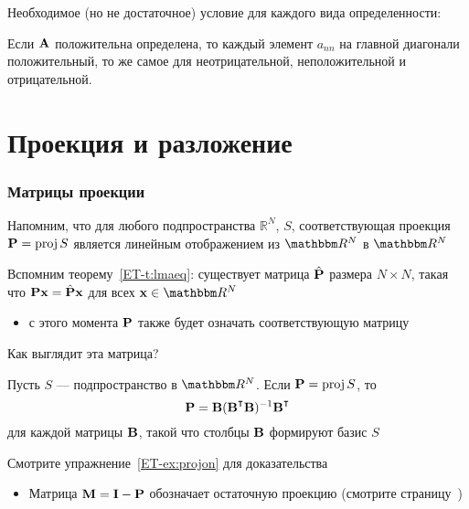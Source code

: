 \begin{frame}

     \vspace{2em}
    Необходимое (но не достаточное) условие для каждого вида определенности:
    
    \vspace{.7em}
    \Fact{\eqref{ET-fa:ipde0}}
        Если $\mathbf A$ положительна определена, то
        каждый элемент $a_{nn}$ на главной диагонали положительный, то же самое для
        неотрицательной, неположительной и отрицательной.
        
\end{frame}

\section{Проекция и разложение}

\begin{frame}\frametitle{Матрицы проекции}

     \vspace{2em}
    Напомним, что для любого подпространства $\mathbb{R}^{N}$, $S$, соответствующая 
    проекция $\mathbf P = \operatorname{proj} S$ является линейным отображением из $\RR^N$ в $\RR^N$

    \vspace{.7em}
    Вспомним теорему~\ref{ET-t:lmaeq}: существует матрица $\hat {\mathbf P}$ размера 
    $N \times N$, такая что $\mathbf P {\mathbf x} =
    \hat {\mathbf P} {\mathbf x}$ для всех $\boldx \in \RR^N$
    \begin{itemize}
        \item с этого момента $\mathbf P$ также будет означать соответствующую матрицу
    \end{itemize} 
    
    Как выглядит эта матрица?
    
\end{frame}

\begin{frame}

     \vspace{.7em}
    \Thm {\eqref{ET-t:projon}}
    Пусть $S$ --- подпространство в $\RR^N$. Если $\mathbf P = \operatorname{proj} S$, то
    \begin{equation}
        \label{eq:projb}
        \boldP = \boldB (\boldB^\T\boldB)^{-1} \boldB^\T  
    \end{equation}
    для каждой матрицы $\mathbf B$, такой что столбцы $\mathbf B$ формируют базис $S$ 
    
    \vspace{.7em}
    Смотрите упражнение~\ref{ET-ex:projon} для доказательства
    
    \begin{itemize}
        \item  Матрица $\mathbf M = \mathbf I -
                \mathbf P$ обозначает остаточную проекцию (смотрите 
                страницу~\pageref{ET-eq:ann0})
    \end{itemize}
    
\end{frame}

